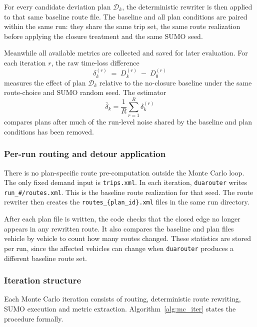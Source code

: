 For every candidate deviation plan $\mathcal{D}_k$, the deterministic rewriter
is then applied to that same baseline route file. The baseline and all plan conditions are paired within the same
run: they share the same trip set, the same route realization before applying
the closure treatment and the same SUMO seed.

Meanwhile all available metrics are collected and saved for later evaluation. For each iteration $r$, the raw time-loss difference
\begin{equation}
  \delta_k^{(r)} \;=\; D_k^{(r)} \;-\; D_0^{(r)}
  \label{eq:paired_delta}
\end{equation}
measures the effect of plan $\mathcal{D}_k$ relative to the no-closure
baseline under the same route-choice and SUMO random seed. The estimator
\begin{equation}
  \bar{\delta}_k = \frac{1}{R}\sum_{r=1}^{R}\delta_k^{(r)}
\end{equation}
compares plans after much of the run-level noise shared by the baseline and
plan conditions has been removed.

\subsubsection{Per-run routing and detour application}
\label{sssec:mc_precomp}

There is no plan-specific route pre-computation outside the Monte Carlo loop.
The only fixed demand input is \texttt{trips.xml}. In each iteration,
\texttt{duarouter} writes \texttt{run\_\#/routes.xml}. This is the baseline
route realization for that seed. The route rewriter then creates the
\texttt{routes\_\{plan\_id\}.xml} files in the same run directory.

After each plan file is written, the code checks that the closed edge no
longer appears in any rewritten route. It also compares the baseline and plan
files vehicle by vehicle to count how many routes changed. These statistics
are stored per run, since the affected vehicles can change when
\texttt{duarouter} produces a different baseline route set.

\subsubsection{Iteration structure}
\label{sssec:mc_iteration}

Each Monte Carlo iteration consists of routing, deterministic route rewriting,
SUMO execution and metric extraction. Algorithm~\ref{alg:mc_iter} states the
procedure formally.

